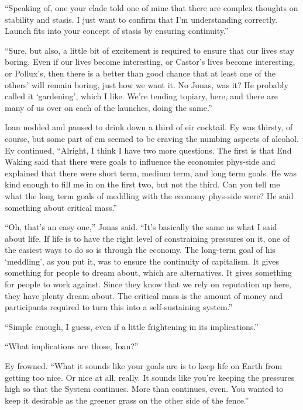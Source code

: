 ``Speaking of, one your clade told one of mine that there are complex thoughts on stability and stasis. I just want to confirm that I'm understanding correctly. Launch fits into your concept of stasis by ensuring continuity.''

``Sure, but also, a little bit of excitement is required to ensure that our lives stay boring. Even if our lives become interesting, or Castor's lives become interesting, or Pollux's, then there is a better than good chance that at least one of the others' will remain boring, just how we want it. No Jonas, was it? He probably called it `gardening', which I like. We're tending topiary, here, and there are many of us over on each of the launches, doing the same.''

Ioan nodded and paused to drink down a third of eir cocktail. Ey was thirsty, of course, but some part of em seemed to be craving the numbing aspects of alcohol. Ey continued, ``Alright, I think I have two more questions. The first is that End Waking said that there were goals to influence the economies phys-side and explained that there were short term, medium term, and long term goals. He was kind enough to fill me in on the first two, but not the third. Can you tell me what the long term goals of meddling with the economy phys-side were? He said something about critical mass.''

``Oh, that's an easy one,'' Jonas said. ``It's basically the same as what I said about life. If life is to have the right level of constraining pressures on it, one of the easiest ways to do so is through the economy. The long-term goal of his `meddling', as you put it, was to ensure the continuity of capitalism. It gives something for people to dream about, which are alternatives. It gives something for people to work against. Since they know that we rely on reputation up here, they have plenty dream about. The critical mass is the amount of money and participants required to turn this into a self-sustaining system.''

``Simple enough, I guess, even if a little frightening in its implications.''

``What implications are those, Ioan?''

Ey frowned. ``What it sounds like your goals are is to keep life on Earth from getting too nice. Or nice at all, really. It sounds like you're keeping the pressures high so that the System continues. More than continues, even. You wanted to keep it desirable as the greener grass on the other side of the fence.''

